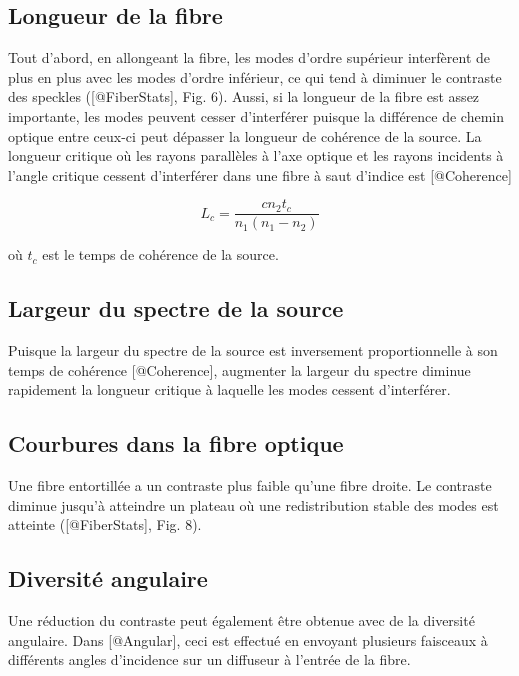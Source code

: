 \documentclass[]{article}
\begin{document}
\subsection{Longueur de la fibre}\label{longueur-de-la-fibre}

Tout d'abord, en allongeant la fibre, les modes d'ordre supérieur
interfèrent de plus en plus avec les modes d'ordre inférieur, ce qui
tend à diminuer le contraste des speckles ({[}@FiberStats{]}, Fig. 6).
Aussi, si la longueur de la fibre est assez importante, les modes
peuvent cesser d'interférer puisque la différence de chemin optique
entre ceux-ci peut dépasser la longueur de cohérence de la source. La
longueur critique où les rayons parallèles à l'axe optique et les rayons
incidents à l'angle critique cessent d'interférer dans une fibre à saut
d'indice est {[}@Coherence{]}

\[
L_{c} = \frac{c n_{2} t_{c}}{n_{1}(n_{1} - n_{2})}
\]

où \(t_c\) est le temps de cohérence de la source.

\subsection{Largeur du spectre de la
source}\label{largeur-du-spectre-de-la-source}

Puisque la largeur du spectre de la source est inversement
proportionnelle à son temps de cohérence {[}@Coherence{]}, augmenter la
largeur du spectre diminue rapidement la longueur critique à laquelle
les modes cessent d'interférer.

\subsection{Courbures dans la fibre
optique}\label{courbures-dans-la-fibre-optique}

Une fibre entortillée a un contraste plus faible qu'une fibre droite. Le
contraste diminue jusqu'à atteindre un plateau où une redistribution
stable des modes est atteinte ({[}@FiberStats{]}, Fig. 8).

\subsection{Diversité angulaire}\label{diversituxe9-angulaire}

Une réduction du contraste peut également être obtenue avec de la
diversité angulaire. Dans {[}@Angular{]}, ceci est effectué en envoyant
plusieurs faisceaux à différents angles d'incidence sur un diffuseur à
l'entrée de la fibre.
\end{document}

